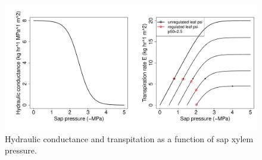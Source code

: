 \documentclass[a4paper]{article}\usepackage[]{graphicx}\usepackage[]{color}
\makeatletter
\def\maxwidth{ %
  \ifdim\Gin@nat@width>\linewidth
    \linewidth
  \else
    \Gin@nat@width
  \fi
}
\newenvironment{knitrout}{}{} %
\makeatother
\begin{document}
\begin{centering}
\begin{knitrout}
\color{fgcolor}\begin{figure}
\includegraphics[width=\maxwidth]{figure/unnamed-chunk-10-1} \caption{\label{fig:figs}Hydraulic conductance and transpitation as a function of sap xylem pressure.}\label{fig:unnamed-chunk-10}
\end{figure}


\end{knitrout}
\end{centering}
\end{document}
